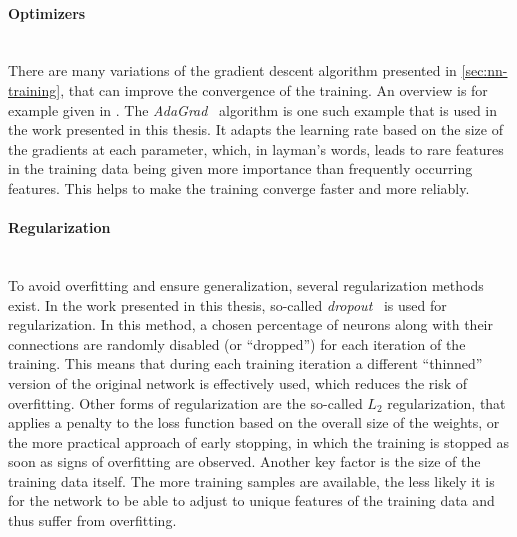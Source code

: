 
\paragraph{Optimizers}\mbox{}\\
There are many variations of the gradient descent algorithm presented in \cref{sec:nn-training}, that can improve the convergence of the training. An overview is for example given in . The \emph{AdaGrad}~ algorithm is one such example that is used in the work presented in this thesis. It adapts the learning rate based on the size of the gradients at each parameter, which, in layman's words, leads to rare features in the training data being given more importance than frequently occurring features. This helps to make the training converge faster and more reliably.

\paragraph{Regularization}\mbox{}\\
To avoid overfitting and ensure generalization, several regularization methods exist. 
In the work presented in this thesis, so-called \emph{dropout}~\cite{srivastava_dropout_2014,DBLP:journals/corr/abs-1207-0580} is used for regularization. In this method, a chosen percentage of neurons along with their connections are randomly disabled (or ``dropped'') for each iteration of the training. This means that during each training iteration a different ``thinned'' version of the original network is effectively used, which reduces the risk of overfitting. 
Other forms of regularization are the so-called $L_2$ regularization, that applies a penalty to the loss function based on the overall size of the weights, or the more practical approach of early stopping, in which the training is stopped as soon as signs of overfitting are observed. 
Another key factor is the size of the training data itself. The more training samples are available, the less likely it is for the network to be able to adjust to unique features of the training data and thus suffer from overfitting.


